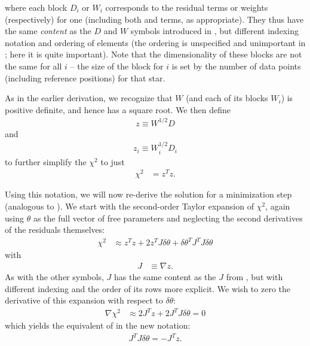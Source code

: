 where each block $D_i$ or $W_i$ corresponds to the residual terms or weights (respectively) for one  (including both  and  terms, as appropriate).
They thus have the same \emph{content} as the $D$ and $W$ symbols introduced in , but different indexing notation and ordering of elements (the ordering is unspecified and unimportant in ; here it is quite important).
Note that the dimensionality of these blocks are not the same for all $i$ -- the size of the block for  $i$ is set by the number of data points (including reference positions) for that star.

As in the earlier derivation, we recognize that $W$ (and each of its blocks $W_i$) is positive definite, and hence has a square root.
We then define
\begin{align}
    z \equiv W^{1/2}D
\end{align}
and
\begin{align}
    z_i \equiv W_i^{1/2}D_i
\end{align}
to further simplify the $\chi^2$ to just
\begin{align}
    \chi^{2} & = z^Tz .
\end{align}

Using this notation, we will now re-derive the solution for a minimization step (analogous to ).
We start with the second-order Taylor expansion of $\chi^2$, again using $\theta$ as the full vector of free parameters and neglecting the second derivatives of the residuals themselves:
\begin{align}
    \chi^2 &\approx z^Tz + 2z^T J\delta\theta
    + \delta\theta^T J^T\!J \delta\theta
\end{align}
with
\begin{align}
    J &\equiv \nabla z.
\end{align}
As with the other symbols, $J$ has the same content as the $J$ from , but with different indexing and the order of its rows more explicit.
We wish to zero the derivative of this expansion with respect to $\delta\theta$:
\begin{align}
    \nabla\chi^2 &\approx 2J^T\!z + 2J^T\!J \delta\theta = 0
\end{align}
which yields the equivalent of  in the new notation:
\begin{align}
    J^T\!J \delta\theta = -J^T\!z. \label{eq:vp_gradient_equation}
\end{align}

